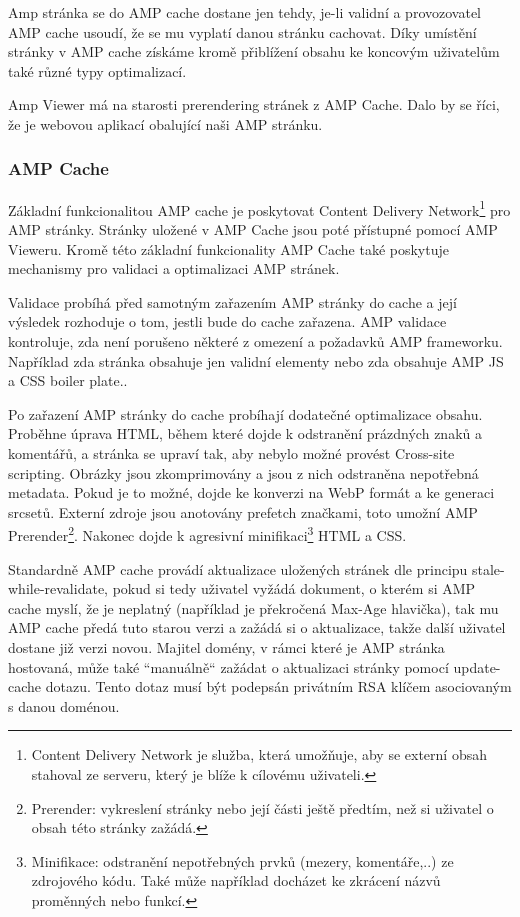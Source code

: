 Amp stránka se do AMP cache dostane jen tehdy, je-li validní a provozovatel AMP cache usoudí, že se mu vyplatí danou stránku cachovat. Díky umístění stránky v AMP cache získáme kromě přiblížení obsahu ke koncovým uživatelům také různé typy optimalizací.

Amp Viewer má na starosti prerendering stránek z AMP Cache. Dalo by se říci, že je webovou aplikací obalující naši AMP stránku. 

\subsubsection*{AMP Cache}
Základní funkcionalitou AMP cache je poskytovat Content Delivery Network\footnote{Content Delivery Network je služba, která umožňuje, aby se externí obsah stahoval ze serveru, který je blíže k cílovému uživateli.} pro AMP stránky. Stránky uložené v AMP Cache jsou poté přístupné pomocí AMP Vieweru.
Kromě této základní funkcionality AMP Cache také poskytuje mechanismy pro validaci a optimalizaci AMP stránek.

Validace probíhá před samotným zařazením AMP stránky do cache a její výsledek rozhoduje o tom, jestli bude do cache zařazena.
AMP validace kontroluje, zda není porušeno některé z omezení a požadavků AMP frameworku. Například zda stránka obsahuje jen validní elementy nebo zda obsahuje AMP JS a CSS boiler plate.\cite{AMPCache}.

Po zařazení AMP stránky do cache probíhají dodatečné optimalizace obsahu.
Proběhne úprava HTML, během které dojde k odstranění prázdných znaků a komentářů, a stránka se upraví tak, aby nebylo možné provést Cross-site scripting\cite{whyAMPCache}.
Obrázky jsou zkomprimovány a jsou z nich odstraněna nepotřebná metadata. Pokud je to možné, dojde ke konverzi na WebP formát a ke generaci srcsetů.
Externí zdroje jsou anotovány prefetch značkami, toto umožní AMP Prerender\footnote{Prerender: vykreslení stránky nebo její části ještě předtím, než si uživatel o obsah této stránky zažádá.}.
Nakonec dojde k agresivní minifikaci\footnote{Minifikace: odstranění nepotřebných prvků (mezery, komentáře,..) ze zdrojového kódu. Také může například docházet ke zkrácení názvů proměnných nebo funkcí.} HTML a CSS.

Standardně AMP cache provádí aktualizace uložených stránek dle principu stale-while-revalidate, pokud si tedy uživatel vyžádá dokument, o kterém si AMP cache myslí, že je neplatný (například  je překročená Max-Age hlavička), tak mu AMP cache předá tuto starou verzi a zažádá si o aktualizace, takže další uživatel dostane již verzi novou\cite{AMPUpdate}.
Majitel domény, v rámci které je AMP stránka hostovaná, může také “manuálně“ zažádat o aktualizaci stránky pomocí update-cache dotazu. Tento dotaz musí být podepsán privátním RSA klíčem asociovaným s danou doménou\cite{AMPUpdateUrl}.


